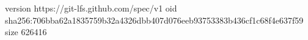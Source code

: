 version https://git-lfs.github.com/spec/v1
oid sha256:706bba62a1835759b32a4326dbb407d076eeb93753383b436cf1c68f4e637f59
size 626416
